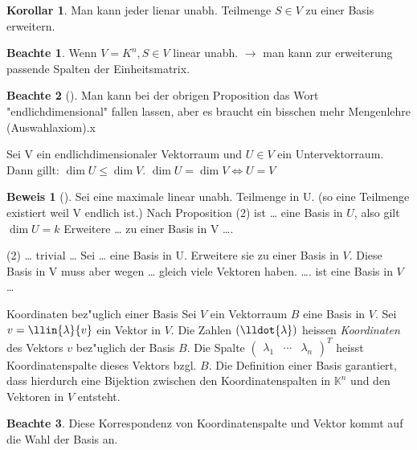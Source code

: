 \documentclass[oneside,fontsize=11pt,paper=a4,BCOR=0mm,DIV=12,automark,headsepline]{scrbook}
\theoremstyle{remark}
\theoremstyle{definition}
\newtheorem*{notte}{Beachte}
\newtheorem*{korollar}{Korollar}
\theoremstyle{definition}
\newtheorem*{prof}{Beweis}
\theoremstyle{remark}
\begin{document}
\begin{korollar}
  Man kann jeder lienar unabh. Teilmenge \(S\in V\) zu einer Basis
  erweitern.
\end{korollar}

\begin{notte}
  Wenn \(V=K^n, S\in V\) linear unabh. \(\rightarrow\) man kann zur erweiterung passende
  Spalten der Einheitsmatrix.
\end{notte}

\begin{notte}[]
  Man kann bei der obrigen Proposition das Wort "endlichdimensional" fallen
  lassen, aber es braucht ein bisschen mehr Mengenlehre (Auswahlaxiom).x
\end{notte}
\begin{theo}{}{}
  Sei V ein endlichdimensionaler Vektorraum und \(U\in V\) ein Untervektorraum. Dann
  gillt: \(\dim U \leq \dim V\).  \(\dim U = \dim V \iff U=V\)
\end{theo}

\begin{prof}[]
  Sei eine maximale linear unabh. Teilmenge in U. (so eine Teilmenge existiert
  weil V endlich ist.)
  Nach Proposition (2) ist \ldots{} eine Basis in \(U\), also gilt \(\dim U = k\) Erweitere
  \ldots{} zu einer Basis in V \ldots{}. 

  (2) \ldots{} trivial \ldots{} Sei \ldots{} eine Basis in U. Erweitere sie zu einer Basis in
  \(V\). Diese Basis in V muss aber wegen \ldots{} gleich viele Vektoren haben. \ldots{}. ist
  eine Basis in \(V\) \ldots{}
\end{prof}


\begin{definition}{Koordinaten bez"uglich einer Basis}{}
  Sei \(V\) ein Vektorraum $B$ eine Basis in $V$. Sei
  $v=\llin{\lambda}{v}$ ein Vektor in $V$. Die Zahlen
  \((\lldot{\lambda})\) heissen \emph{Koordinaten} des Vektors $v$ bez"uglich
  der Basis $B$. Die Spalte
  $\begin{pmatrix}
    \lambda_1
    & \cdots
    & \lambda_n
  \end{pmatrix}^T$ heisst Koordinatenspalte dieses Vektors
  bzgl. \(B\).  Die Definition einer Basis garantiert, dass hierdurch
  eine Bijektion zwischen den Koordinatenspalten in $\mathbb{K}^n$ und
  den Vektoren in $V$ entsteht.
\end{definition}

\begin{notte}
  Diese Korrespondenz von Koordinatenspalte und Vektor kommt auf die
  Wahl der Basis an.
\end{notte}
\end{document}
